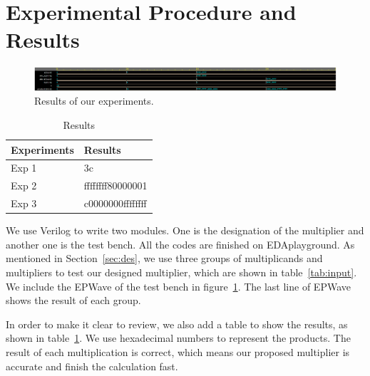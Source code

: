 \documentclass[twoside,twocolumn]{article}
\begin{document}

\section{Experimental Procedure and Results}

\begin{figure}
	\centering
	\includegraphics[scale=0.3, clip=true]{../code/EPWave.png}
	\vspace{-2mm}
	\caption{Results of our experiments.}
	\label{fig:ep}
	\vspace{-5mm}
\end{figure}

\begin{table}
	\centering
	\begin{tabular}{l|l}
		\toprule
		\cmidrule(r){1-2}
		Experiments & Results \\
		\hline
		Exp 1 & 3c \\
		Exp 2 & ffffffff80000001 \\
		Exp 3 & c0000000ffffffff \\
		\bottomrule
	\end{tabular}
    \caption{Results}
	\label{tab:res}
\end{table}

We use Verilog to write two modules. One is the designation of the multiplier and another one is the test bench. All the codes are finished on EDAplayground. As mentioned in Section~\ref{sec:des}, we use three groups of multiplicands and multipliers to test our designed multiplier, which are shown in table~\ref{tab:input}. We include the EPWave of the test bench in figure~\ref*{fig:ep}. The last line of EPWave shows the result of each group.

In order to make it clear to review, we also add a table to show the results, as shown in table~\ref{tab:res}. We use hexadecimal numbers to represent the products. The result of each multiplication is correct, which means our proposed multiplier is accurate and finish the calculation fast.

\end{document}
